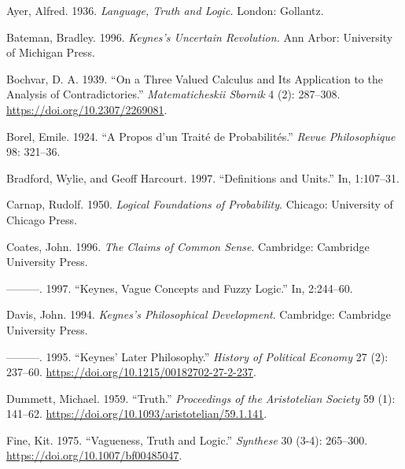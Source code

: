 \documentclass[noflushend]{philosophersimprint}
\newlength{\cslhangindent}
\newenvironment{CSLReferences}[3] %
 {%
  \setlength{\parindent}{0pt}
  \ifodd #1 \everypar{\setlength{\hangindent}{\cslhangindent}}\ignorespaces\fi
  \ifnum #2 > 0
  \setlength{\parskip}{#2\baselineskip}
  \fi
 }%
 {}
\begin{document}
\hypertarget{refs}{}
\begin{CSLReferences}{1}{0}

\leavevmode{}%
Ayer, Alfred. 1936. \emph{Language, Truth and Logic.} London: Gollantz.

\leavevmode{}%
Bateman, Bradley. 1996. \emph{Keynes's Uncertain Revolution.} Ann Arbor:
University of Michigan Press.

\leavevmode{}%
Bochvar, D. A. 1939. {``On a Three Valued Calculus and Its Application
to the Analysis of Contradictories.''} \emph{Matematicheskii Sbornik} 4
(2): 287--308. \url{https://doi.org/10.2307/2269081}.

\leavevmode{}%
Borel, Emile. 1924. {``A Propos d'un Trait{é} de Probabilit{é}s.''}
\emph{Revue Philosophique} 98: 321--36.

\leavevmode{}%
Bradford, Wylie, and Geoff Harcourt. 1997. {``Definitions and Units.''}
In, 1:107--31.

\leavevmode{}%
Carnap, Rudolf. 1950. \emph{Logical Foundations of Probability}.
Chicago: University of Chicago Press.

\leavevmode{}%
Coates, John. 1996. \emph{The Claims of Common Sense}. Cambridge:
Cambridge University Press.

\leavevmode{}%
---------. 1997. {``Keynes, Vague Concepts and Fuzzy Logic.''} In,
2:244--60.

\leavevmode{}%
Davis, John. 1994. \emph{Keynes's Philosophical Development}. Cambridge:
Cambridge University Press.

\leavevmode{}%
---------. 1995. {``Keynes' Later Philosophy.''} \emph{History of
Political Economy} 27 (2): 237--60.
\url{https://doi.org/10.1215/00182702-27-2-237}.

\leavevmode{}%
Dummett, Michael. 1959. {``Truth.''} \emph{Proceedings of the
Aristotelian Society} 59 (1): 141--62.
\url{https://doi.org/10.1093/aristotelian/59.1.141}.

\leavevmode{}%
Fine, Kit. 1975. {``Vagueness, Truth and Logic.''} \emph{Synthese} 30
(3-4): 265--300. \url{https://doi.org/10.1007/bf00485047}.


\end{CSLReferences}
\end{document}

